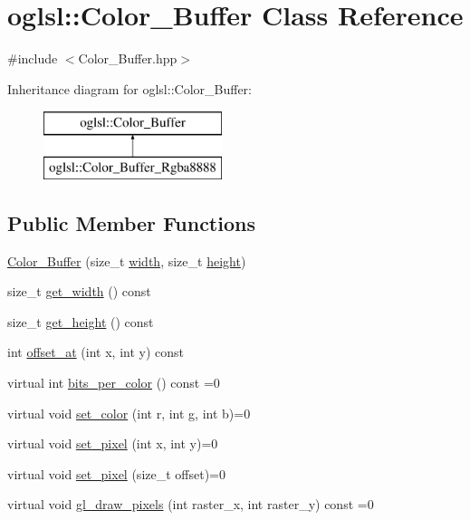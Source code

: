 \hypertarget{classoglsl_1_1_color___buffer}{}\section{oglsl\+:\+:Color\+\_\+\+Buffer Class Reference}
\label{classoglsl_1_1_color___buffer}


{\ttfamily \#include $<$Color\+\_\+\+Buffer.\+hpp$>$}

Inheritance diagram for oglsl\+:\+:Color\+\_\+\+Buffer\+:\begin{figure}[H]
\begin{center}
\leavevmode
\includegraphics[height=2.000000cm]{classoglsl_1_1_color___buffer}
\end{center}
\end{figure}
\subsection*{Public Member Functions}
\begin{DoxyCompactItemize}
\item 
\mbox{\hyperlink{classoglsl_1_1_color___buffer_aef41961965c6ee31c7948e8d917e9128}{Color\+\_\+\+Buffer}} (size\+\_\+t \mbox{\hyperlink{classoglsl_1_1_color___buffer_a520198eca2cfb64729d134d12efae304}{width}}, size\+\_\+t \mbox{\hyperlink{classoglsl_1_1_color___buffer_a18db6640d6dec54b6695821b9dcaf9c5}{height}})
\item 
size\+\_\+t \mbox{\hyperlink{classoglsl_1_1_color___buffer_ad8f3838322c9e15aa4ebe0f687f0c482}{get\+\_\+width}} () const
\item 
size\+\_\+t \mbox{\hyperlink{classoglsl_1_1_color___buffer_ae13e503d22d65745da0c8c83fb024e5c}{get\+\_\+height}} () const
\item 
int \mbox{\hyperlink{classoglsl_1_1_color___buffer_a0db75521a37e974d14c2b984aabe3c51}{offset\+\_\+at}} (int x, int y) const
\item 
virtual int \mbox{\hyperlink{classoglsl_1_1_color___buffer_a0d182abbbcfddd72467ce085b7eb88b7}{bits\+\_\+per\+\_\+color}} () const =0
\item 
virtual void \mbox{\hyperlink{classoglsl_1_1_color___buffer_a200116c77f9ce43da0156e4260aa1e71}{set\+\_\+color}} (int r, int g, int b)=0
\item 
virtual void \mbox{\hyperlink{classoglsl_1_1_color___buffer_a45662e4f8c5d9776eb125d1c605d36d8}{set\+\_\+pixel}} (int x, int y)=0
\item 
virtual void \mbox{\hyperlink{classoglsl_1_1_color___buffer_aa3b45a2c94da2a9b3e410637152a6a91}{set\+\_\+pixel}} (size\+\_\+t offset)=0
\item 
virtual void \mbox{\hyperlink{classoglsl_1_1_color___buffer_a250795f2a7e3b8edc47accc5605d62a3}{gl\+\_\+draw\+\_\+pixels}} (int raster\+\_\+x, int raster\+\_\+y) const =0
\end{DoxyCompactItemize}

